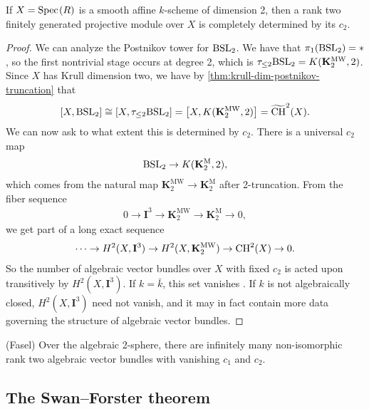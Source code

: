 \documentclass[11pt,openany]{book}
\providecommand{\KM}{\mathbf{K}^\mathrm{M}}
\providecommand{\KMW}{\mathbf{K}^\mathrm{MW}}
\providecommand{\CHW}{\widetilde{\mathrm{CH}}}
\begin{document}
\begin{theorem} If $X = \text{Spec}\hspace{0.1em}(R)$ is a smooth affine $k$-scheme of dimension 2, then a rank two finitely generated projective module over $X$ is completely determined by its $c_2$.
\end{theorem}
\begin{proof} We can analyze the Postnikov tower for $\mathrm{BSL}_2$. We have that $\pi_1(\mathrm{BSL}_2) = \ast$, so the first nontrivial stage occurs at degree 2, which is $\tau_{\le 2}\BSL_2 = K(\KMW_2,2)$. Since $X$ has Krull dimension two, we have by \autoref{thm:krull-dim-postnikov-truncation} that
\begin{align*}
    \left[ X,\BSL_2 \right] \cong \left[ X,\tau_{\le 2}\BSL_2 \right] = \left[ X, K(\KMW_2,2) \right] = \CHW^2(X).
\end{align*}
We can now ask to what extent this is determined by $c_2$. There is a universal $c_2$ map
\begin{align*}
    \BSL_2 \to K(\KM_2,2),
\end{align*}
which comes from the natural map $\KMW_2 \to \KM_2$ after 2-truncation. From the fiber sequence
\begin{align*}
    0 \to \mathbf{I}^3 \to \KMW_2 \to \KM_2 \to 0,
\end{align*}
we get part of a long exact sequence
\begin{align*}
    \cdots \to H^2(X,\mathbf{I}^3) \to H^2(X,\KMW_2) \to \CH^2(X) \to 0.
\end{align*}
So the number of algebraic vector bundles over $X$ with fixed $c_2$ is acted upon transitively by $H^2(X,\mathbf{I}^3)$. If $k = \bar{k}$, this set vanishes \cite[5.1]{AF3}. If $k$ is not algebraically closed, $H^2(X,\mathbf{I}^3)$ need not vanish, and it may in fact contain more data governing the structure of algebraic vector bundles. 
\end{proof}

\begin{example} (Fasel) Over the algebraic 2-sphere, there are infinitely many non-isomorphic rank two algebraic vector bundles with vanishing $c_1$ and $c_2$.
\end{example}

\subsection{The Swan--Forster theorem}
\end{document}
